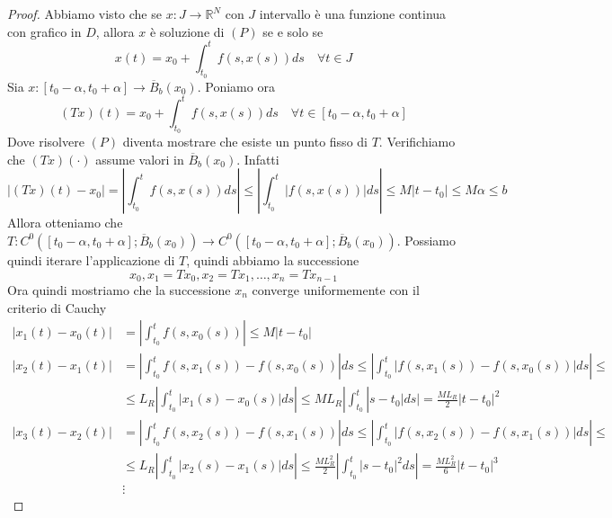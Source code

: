 \begin{proof}
    Abbiamo visto che se \(x : J \to \mathbb{R}^{N}\) con \(J\) intervallo è una
    funzione continua con grafico in \(D\), allora \(x\) è soluzione di \((P)\)
    se e solo se 
    \[
        x(t) = x_{0} + \int_{t_{0}}^{t} f(s, x(s)) ds \quad \forall t \in J
    \]
    Sia \(x : [t_{0} - \alpha , t_{0} + \alpha] \to \overline{B}_b(x_{0})\).
    Poniamo ora
    \[
        (Tx)(t) = x_{0} + \int_{t_{0}}^{t} f(s, x(s)) ds \quad \forall t \in
        [t_{0} - \alpha, t_{0} + \alpha]
    \]
    Dove risolvere \((P)\) diventa mostrare che esiste un punto fisso di \(T\).
    Verifichiamo che \((Tx)(\cdot )\) assume valori in
    \(\overline{B}_b(x_{0})\). Infatti 
    \[
        |(Tx)(t) - x_{0}| = \left| \int_{t_{0}}^{t} f(s, x(s)) ds \right| \le
        \left|\int_{t_{0}}^{t} |f(s, x(s))| ds \right| \le M|t - t_{0}| \le M\alpha \le b
    \]
    Allora otteniamo che \(T : C^{0}([t_{0}-\alpha, t_{0} + \alpha];
    \overline{B}_b(x_{0})) \to C^{0}([t_{0}-\alpha, t_{0} + \alpha];
    \overline{B}_b(x_{0}))\). Possiamo quindi iterare l'applicazione di \(T\),
    quindi abbiamo la successione 
    \[
        x_{0}, x_{1} = Tx_{0}, x_{2} = Tx_{1}, \ldots, x_{n} = Tx_{n-1}
    \]
    Ora quindi mostriamo che la successione \(x_{n}\) converge uniformemente con
    il criterio di Cauchy
    \begin{align*}
        |x_{1}(t) - x_{0}(t)| &= \left| \int_{t_{0}}^{t} f(s, x_{0}(s))\right|
        \le M|t - t_{0}| \\
        |x_{2}(t) - x_{1}(t)| &= \left| \int_{t_{0}}^{t} f(s, x_{1}(s)) - f(s,
        x_{0}(s))\right| ds \le  \left| \int_{t_{0}}^{t} |f(s, x_{1}(s)) - f(s,
        x_{0}(s))| ds \right| \le \\
                                   &\le L_R \left|\int_{t_{0}}^{t} |x_{1}(s) - x_{0}(s)| ds\right| \le ML_R
        |\int_{t_{0}}^{t}|s-t_{0}| ds| = \frac{ML_R}{2} |t - t_{0}|^2
    \end{align*}
    \begin{align*}
        |x_{3}(t) - x_{2}(t)| &= \left| \int_{t_{0}}^{t} f(s, x_{2}(s)) - f(s,
        x_{1}(s))\right| ds \le \left| \int_{t_{0}}^{t} |f(s, x_{2}(s)) - f(s,
        x_{1}(s))| ds \right| \le \\
                              &\le L_R \left|\int_{t_{0}}^{t} |x_{2}(s) - x_{1}(s)| ds\right| \le
        \frac{ML_R^2}{2}
        \left|\int_{t_{0}}^{t}|s-t_{0}|^2 ds\right| = \frac{ML_R^2}{6} |t - t_{0}|^3
                           \\ &\vdots

\end{align*}
\end{proof}
